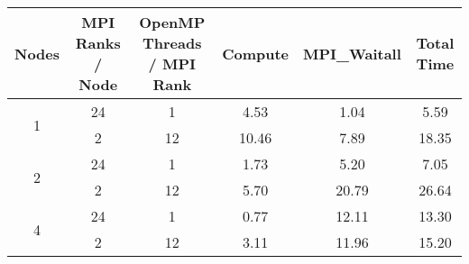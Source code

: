 \begin{tabular}{cccccc}
    \toprule
    Nodes & MPI Ranks / Node & OpenMP Threads / MPI Rank & Compute & MPI\_Waitall & Total Time \\
    \midrule
    \multirow{2}{*}{1} & 24 & 1 & 4.53 & 1.04 & 5.59 \\
    & 2 & 12 & 10.46 & 7.89 & 18.35 \\
    \midrule
    \multirow{2}{*}{2} & 24 & 1 & 1.73 & 5.20 & 7.05 \\
    & 2 & 12 & 5.70 & 20.79 & 26.64 \\
    \midrule
    \multirow{2}{*}{4} & 24 & 1 & 0.77 & 12.11 & 13.30 \\
    & 2 & 12 & 3.11 & 11.96 & 15.20 \\
    \bottomrule
\end{tabular}
